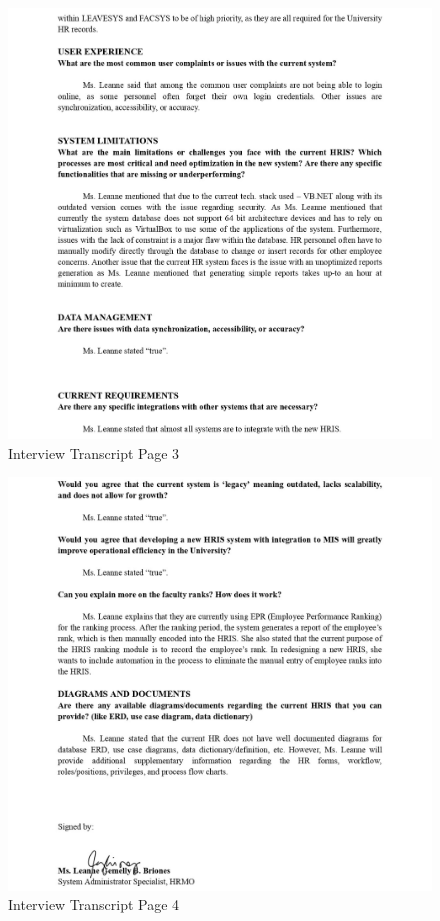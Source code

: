 \begin{figure}[H]
    \centering
    \includegraphics[width=1\linewidth]{figures/misc/interview-transcript-0003.jpg}
    \caption{Interview Transcript Page 3}
    \label{fig:interview-transcript-0003}
\end{figure}

\begin{figure}[H]
    \centering
    \includegraphics[width=1\linewidth]{figures/misc/interview-transcript-0004.jpg}
    \caption{Interview Transcript Page 4}
    \label{fig:interview-transcript-0004}
\end{figure}